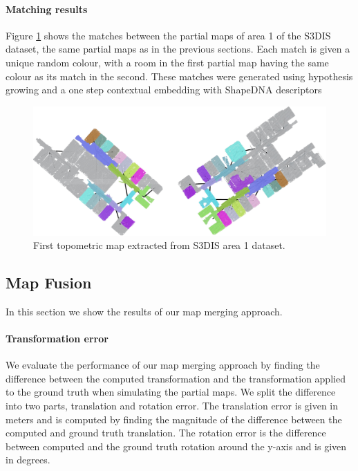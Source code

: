 \paragraph{Matching results}
Figure \ref{fig:area_1_match} shows the matches between the partial maps of area 1 of the S3DIS dataset, the same partial maps as in the previous sections. Each match is given a unique random colour, with a room in the first partial map having the same colour as its match in the second. These matches were generated using hypothesis growing and a one step contextual embedding with ShapeDNA descriptors


\begin{figure}[h]
    \centering
    \includegraphics*[width=\textwidth]{./fig/area_1_match.pdf}
    \caption{First topometric map extracted from S3DIS area 1 dataset.}
    \label{fig:area_1_match}
\end{figure}

\pagebreak

\subsection{Map Fusion}
In this section we show the results of our map merging approach. 

\paragraph{Transformation error}
We evaluate the performance of our map merging approach by finding the difference between the computed transformation and the transformation applied to the ground truth when simulating the partial maps. We split the difference into two parts, translation and rotation error. The translation error is given in meters and is computed by finding the magnitude of the difference between the computed and ground truth translation. The rotation error is the difference between computed and the ground truth rotation around the y-axis and is given in degrees.

